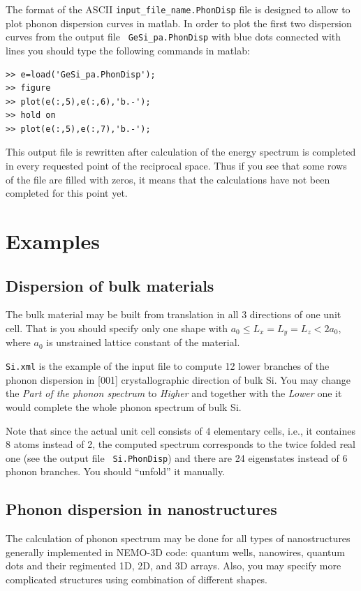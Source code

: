 \documentclass[12pt]{article}
\begin{document}
The format of the ASCII {\tt input\_file\_name.PhonDisp} file is
designed to allow to plot phonon dispersion curves in matlab. In order
to plot the first two dispersion curves from the output file {\tt
GeSi\_pa.PhonDisp} with blue dots connected with lines you should type
the following commands in matlab:
\begin{verbatim}
>> e=load('GeSi_pa.PhonDisp');
>> figure
>> plot(e(:,5),e(:,6),'b.-');
>> hold on
>> plot(e(:,5),e(:,7),'b.-');
\end{verbatim}

This output file is rewritten after calculation of the energy spectrum is
completed in every requested point of the reciprocal space. Thus if
you see that some rows of the file are filled with zeros, it means
that the calculations have not been completed for this point yet.

\section{Examples}
\subsection{Dispersion of bulk materials}
The bulk material may be built from translation in all 3 directions of
one unit cell. That is you should specify only one shape with
$a_0 \leq L_x=L_y=L_z < 2a_0$, where $a_0$ is unstrained lattice constant of
the material.

{\tt Si.xml} is the example of the input file to compute 12 lower
branches of the phonon dispersion in [001] crystallographic
direction of bulk Si. You may change the {\it Part of the phonon spectrum} to
{\it Higher} and together with the {\it Lower} one it would complete the
whole phonon spectrum of bulk Si.

Note that since the actual unit cell consists of 4 elementary cells,
i.e., it containes 8 atoms instead of 2, the computed spectrum corresponds to the
twice folded real one (see the output file {\tt
  Si.PhonDisp}) and there are 24 eigenstates instead of 6 phonon
branches. You should ``unfold'' it manually.

\subsection{Phonon dispersion in nanostructures}
The calculation of phonon spectrum may be done for all types of
nanostructures generally implemented in NEMO-3D code: quantum wells,
nanowires, quantum dots and their regimented 1D, 2D, and 3D
arrays. Also, you may specify more complicated structures using
combination of different shapes.
\end{document}

